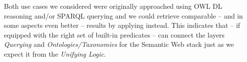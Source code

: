 Both use cases we considered were originally approached using OWL DL reasoning and/or SPARQL querying and we could retrieve 
comparable -- and in some aspects even better -- results by applying 
\nthreelogic instead. This indicates that \nthreelogic -- if equipped with the right set of built-in predicates -- can connect the layers \emph{Querying}
and \emph{Ontologies/Taxonomies} for the Semantic Web stack just as we expect it from the \emph{Unifying Logic}.

